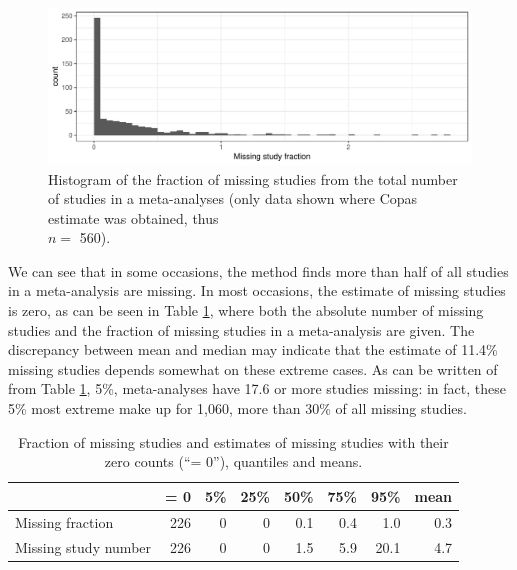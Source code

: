 \documentclass[11pt,a4paper,twoside]{book}\usepackage[]{graphicx}\usepackage[]{color}
\newenvironment{knitrout}{}{} %
\begin{document}
\begin{figure}
\begin{knitrout}
\color{fgcolor}

{\centering \includegraphics[width=\textwidth-3cm]{figure/ch03_figunnamed-chunk-26-1} 

}



\end{knitrout}
\caption{Histogram of the fraction of missing studies from the total number of studies in a meta-analyses (only data shown where Copas estimate was obtained, thus \\$n =$ 560).}
\label{fig:copas.missing}
\end{figure}

\vspace{-2mm}
We can see that in some occasions, the method finds more than half of all studies in a meta-analysis are missing. In most occasions, the estimate of missing studies is zero, as can be seen in Table \ref{copas.missing}, where both the absolute number of missing studies and the fraction of missing studies in a meta-analysis are given. The discrepancy between mean and median may indicate that the estimate of 11.4\% missing studies depends somewhat on these extreme cases. As can be written of from Table \ref{copas.missing}, 5\%,  meta-analyses have 17.6 or more studies missing: in fact, these 5\% most extreme make up for 1,060, more than 30\% of all missing studies.

\begin{table}[ht]
\centering
\begingroup\footnotesize
\begin{tabular}{lrrrrrrr}
  \hline
 & = 0 & 5\% & 25\% & 50\% & 75\% & 95\% & mean \\ 
  \hline
Missing fraction & 226 & 0 & 0 & 0.1 & 0.4 & 1.0 & 0.3 \\ 
  Missing study number & 226 & 0 & 0 & 1.5 & 5.9 & 20.1 & 4.7 \\ 
   \hline
\end{tabular}
\endgroup
\caption{Fraction of missing studies and estimates of missing studies with their zero counts (``= 0''), quantiles and means.} 
\label{copas.missing}
\end{table}
\end{document}
